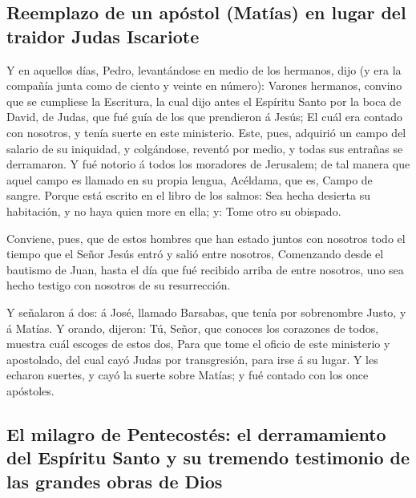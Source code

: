 \hypertarget{reemplazo-de-un-apuxf3stol-matuxedas-en-lugar-del-traidor-judas-iscariote}{%
\subsection{Reemplazo de un apóstol (Matías) en lugar del traidor Judas
Iscariote}\label{reemplazo-de-un-apuxf3stol-matuxedas-en-lugar-del-traidor-judas-iscariote}}

 Y en aquellos días, Pedro, levantándose en medio de los
hermanos, dijo (y era la compañía junta como de ciento y veinte en
número):  Varones hermanos, convino que se cumpliese la
Escritura, la cual dijo antes el Espíritu Santo por la boca de David, de
Judas, que fué guía de los que prendieron á Jesús;  El cuál
era contado con nosotros, y tenía suerte en este ministerio.
 Este, pues, adquirió un campo del salario de su iniquidad,
y colgándose, reventó por medio, y todas sus entrañas se derramaron.
 Y fué notorio á todos los moradores de Jerusalem; de tal
manera que aquel campo es llamado en su propia lengua, Acéldama, que es,
Campo de sangre.  Porque está escrito en el libro de los
salmos: Sea hecha desierta su habitación, y no haya quien more en ella;
y: Tome otro su obispado.

 Conviene, pues, que de estos hombres que han estado juntos
con nosotros todo el tiempo que el Señor Jesús entró y salió entre
nosotros,  Comenzando desde el bautismo de Juan, hasta el
día que fué recibido arriba de entre nosotros, uno sea hecho testigo con
nosotros de su resurrección.

 Y señalaron á dos: á José, llamado Barsabas, que tenía por
sobrenombre Justo, y á Matías.  Y orando, dijeron: Tú,
Señor, que conoces los corazones de todos, muestra cuál escoges de estos
dos,  Para que tome el oficio de este ministerio y
apostolado, del cual cayó Judas por transgresión, para irse á su lugar.
 Y les echaron suertes, y cayó la suerte sobre Matías; y
fué contado con los once apóstoles.

\hypertarget{el-milagro-de-pentecostuxe9s-el-derramamiento-del-espuxedritu-santo-y-su-tremendo-testimonio-de-las-grandes-obras-de-dios}{%
\subsection{El milagro de Pentecostés: el derramamiento del Espíritu
Santo y su tremendo testimonio de las grandes obras de
Dios}\label{el-milagro-de-pentecostuxe9s-el-derramamiento-del-espuxedritu-santo-y-su-tremendo-testimonio-de-las-grandes-obras-de-dios}}

